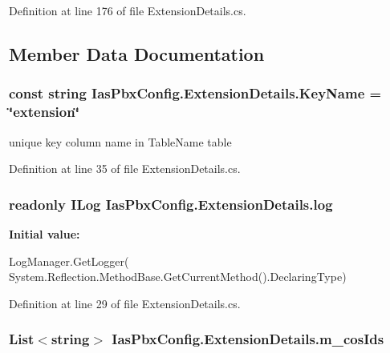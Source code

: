 Definition at line 176 of file ExtensionDetails.cs.

\subsection{Member Data Documentation}
\hypertarget{class_ias_pbx_config_1_1_extension_details_ab5577b60085bb47be22b3c90c3e0fe04}{
\subsubsection[{KeyName}]{\setlength{\rightskip}{0pt plus 5cm}const string {\bf IasPbxConfig.ExtensionDetails.KeyName} = \char`\"{}extension\char`\"{}}}
\label{class_ias_pbx_config_1_1_extension_details_ab5577b60085bb47be22b3c90c3e0fe04}


unique key column name in TableName table 

Definition at line 35 of file ExtensionDetails.cs.\hypertarget{class_ias_pbx_config_1_1_extension_details_ab238f35aaa674eb6fb48a48e5df856ed}{
\subsubsection[{log}]{\setlength{\rightskip}{0pt plus 5cm}readonly ILog {\bf IasPbxConfig.ExtensionDetails.log}}}
\label{class_ias_pbx_config_1_1_extension_details_ab238f35aaa674eb6fb48a48e5df856ed}
{\bfseries Initial value:}
\begin{DoxyCode}
 LogManager.GetLogger(
            System.Reflection.MethodBase.GetCurrentMethod().DeclaringType)
\end{DoxyCode}


Definition at line 29 of file ExtensionDetails.cs.\hypertarget{class_ias_pbx_config_1_1_extension_details_af25b0209f111193cbabc39fdbb01bbb5}{
\subsubsection[{m\_\-cosIds}]{\setlength{\rightskip}{0pt plus 5cm}List$<$string$>$ {\bf IasPbxConfig.ExtensionDetails.m\_\-cosIds}}}
\label{class_ias_pbx_config_1_1_extension_details_af25b0209f111193cbabc39fdbb01bbb5}



